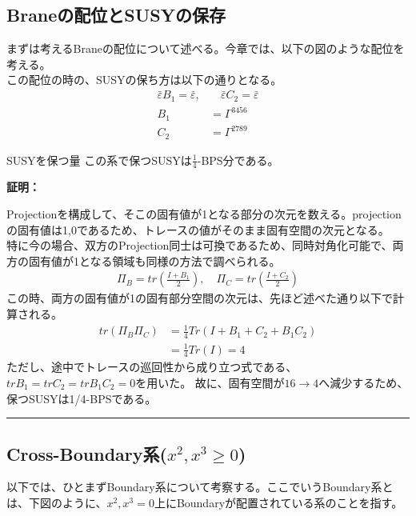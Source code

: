 \documentclass[dvipdfmx,a4paper,10.5pt]{article}
\numberwithin{equation}{section}
\newenvironment{proofbox}
{\begin{prooflabel}\textbf{証明：}\end{prooflabel}\vspace{0.8em}}
{\par\vspace{1em}\hrule\vspace{1em}}
\begin{document}
\subsection{Braneの配位とSUSYの保存}
まずは考えるBraneの配位について述べる。今章では、以下の図のような配位を考える。\\
この配位の時の、SUSYの保ち方は以下の通りとなる。
\begin{align*}
    \bar{\varepsilon}B_{1}=\bar{\varepsilon},&\quad \bar{\varepsilon}C_{2}=\bar{\varepsilon}\\
    B_{1}&=\Gamma^{3456}\\
    C_{2}&=\Gamma^{2789}
\end{align*}
\begin{resultbox}{SUSYを保つ量}
    この系で保つSUSYは$\frac{1}{4}$-BPS分である。
\end{resultbox}
\begin{proofbox}
    Projectionを構成して、そこの固有値が1となる部分の次元を数える。projectionの固有値は1,0であるため、トレースの値がそのまま固有空間の次元となる。\\
    特に今の場合、双方のProjection同士は可換であるため、同時対角化可能で、両方の固有値が1となる領域も同様の方法で調べられる。
    \begin{align*}
        \Pi_{B}=tr(\frac{I+B_{1}}{2}),\quad \Pi_{C}=tr(\frac{I+C_{2}}{2})
    \end{align*}
    この時、両方の固有値が1の固有部分空間の次元は、先ほど述べた通り以下で計算される。
    \begin{align*}
        tr(\Pi_{B}\Pi_{C})&=\frac{1}{4}Tr(I+B_{1}+C_{2}+B_{1}C_{2})\\
        &=\frac{1}{4}Tr(I)=4
    \end{align*}
    ただし、途中でトレースの巡回性から成り立つ式である、$trB_{1}=trC_{2}=trB_{1}C_{2}=0$を用いた。
    故に、固有空間が$16\to4$へ減少するため、保つSUSYは1/4-BPSである。
\end{proofbox}
\subsection{Cross-Boundary系($x^{2},x^{3}\geq 0$)}
以下では、ひとまずBoundary系について考察する。ここでいうBoundary系とは、下図のように、$x^{2},x^{3}=0$上にBoundaryが配置されている系のことを指す。
\end{document}
